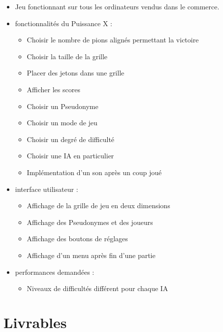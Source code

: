\documentclass[a4paper,oneside]{article}
\begin{document}
\begin{itemize}
    \item Jeu fonctionnant sur tous les ordinateurs vendus dans le commerce.
    \item fonctionnalités du Puissance X :
        \begin{itemize}
        	\item Choisir le nombre de pions alignés permettant la victoire
        	\item Choisir la taille de la grille
            	\item Placer des jetons dans une grille
            	\item Afficher les scores
            	\item Choisir un Pseudonyme 
            	\item Choisir un mode de jeu
            	\item Choisir un degré de difficulté
		\item Choisir une IA en particulier
            	\item Implémentation d'un son après un coup joué
        \end{itemize}
    \item interface utilisateur :
        \begin{itemize}
            	\item Affichage de la grille de jeu en deux dimensions
            	\item Affichage des Pseudonymes et des joueurs
            	\item Affichage des boutons de réglages
            	\item Affichage d'un menu après fin d'une partie
        \end{itemize}
    \item performances demandées :
        \begin{itemize}
            	\item Niveaux de difficultés différent pour chaque IA
        \end{itemize}

\end{itemize}



\newpage

\appendix

\section{Livrables}
\end{document}
